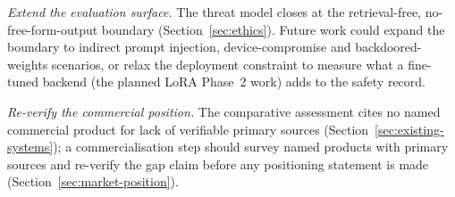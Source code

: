 \emph{Extend the evaluation surface.} The threat model closes at the
retrieval-free, no-free-form-output boundary (Section~\ref{sec:ethics}). Future
work could expand the boundary to indirect prompt injection, device-compromise
and backdoored-weights scenarios, or relax the deployment constraint to measure
what a fine-tuned backend (the planned LoRA Phase~2 work) adds to the safety
record.

\emph{Re-verify the commercial position.} The comparative assessment cites no
named commercial product for lack of verifiable primary sources
(Section~\ref{sec:existing-systems}); a commercialisation step should survey
named products with primary sources and re-verify the gap claim before any
positioning statement is made (Section~\ref{sec:market-position}).